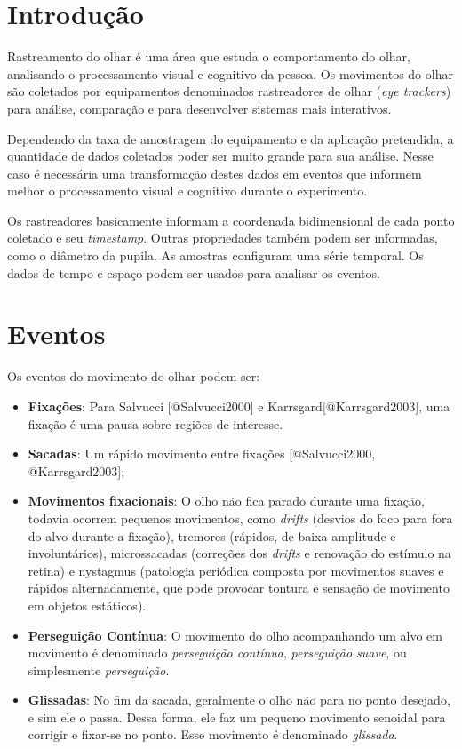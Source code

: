 \section{Introdução}\label{introduuxe7uxe3o}

Rastreamento do olhar é uma área que estuda o comportamento do olhar,
analisando o processamento visual e cognitivo da pessoa. Os movimentos
do olhar são coletados por equipamentos denominados rastreadores de
olhar (\emph{eye trackers}) para análise, comparação e para desenvolver
sistemas mais interativos.

Dependendo da taxa de amostragem do equipamento e da aplicação
pretendida, a quantidade de dados coletados poder ser muito grande para
sua análise. Nesse caso é necessária uma transformação destes dados em
eventos que informem melhor o processamento visual e cognitivo durante o
experimento.

Os rastreadores basicamente informam a coordenada bidimensional de cada
ponto coletado e seu \emph{timestamp}. Outras propriedades também podem
ser informadas, como o diâmetro da pupila. As amostras configuram uma
série temporal. Os dados de tempo e espaço podem ser usados para
analisar os eventos.

\section{Eventos}\label{eventos}

Os eventos do movimento do olhar podem ser:

\begin{itemize}
\itemsep1pt\parskip0pt
\item
  \textbf{Fixações}: Para Salvucci {[}@Salvucci2000{]} e
  Karrsgard{[}@Karrsgard2003{]}, uma fixação é uma pausa sobre regiões
  de interesse.
\item
  \textbf{Sacadas}: Um rápido movimento entre fixações {[}@Salvucci2000,
  @Karrsgard2003{]};
\item
  \textbf{Movimentos fixacionais}: O olho não fica parado durante uma
  fixação, todavia ocorrem pequenos movimentos, como \emph{drifts}
  (desvios do foco para fora do alvo durante a fixação), tremores
  (rápidos, de baixa amplitude e involuntários), microssacadas
  (correções dos \emph{drifts} e renovação do estímulo na retina) e
  nystagmus (patologia periódica composta por movimentos suaves e
  rápidos alternadamente, que pode provocar tontura e sensação de
  movimento em objetos estáticos).
\item
  \textbf{Perseguição Contínua}: O movimento do olho acompanhando um
  alvo em movimento é denominado \emph{perseguição contínua},
  \emph{perseguição suave}, ou simplesmente \emph{perseguição}.
\item
  \textbf{Glissadas}: No fim da sacada, geralmente o olho não para no
  ponto desejado, e sim ele o passa. Dessa forma, ele faz um pequeno
  movimento senoidal para corrigir e fixar-se no ponto. Esse movimento é
  denominado \emph{glissada}.
\end{itemize}

